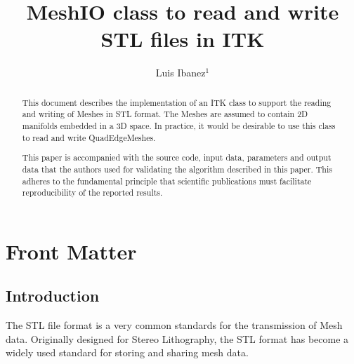 \documentclass{InsightArticle}
\title{MeshIO class to read and write STL files in ITK}
\author{Luis Ibanez$^{1}$}
\newcommand{\IJhandlerIDnumber}{1338}
\begin{document}
%
%
\IJhandlefooter{\IJhandlerIDnumber}


\ifpdf
\else
\fi


\maketitle


\ifhtml
\chapter*{Front Matter\label{front}}
\fi


\begin{abstract}
\noindent
This document describes the implementation of an ITK class to support the
reading and writing of Meshes in STL format. The Meshes are assumed to contain
2D manifolds embedded in a 3D space. In practice, it would be desirable to use
this class to read and write QuadEdgeMeshes.

This paper is accompanied with the source code, input data, parameters and
output data that the authors used for validating the algorithm described in
this paper. This adheres to the fundamental principle that scientific
publications must facilitate reproducibility of the reported results.

\end{abstract}

\IJhandlenote{\IJhandlerIDnumber}

\tableofcontents

\section{Introduction}

The STL file format is a very common standards for the transmission of Mesh
data.  Originally designed for Stereo Lithography, the STL format has become a
widely used standard for storing and sharing mesh data.
\end{document}
